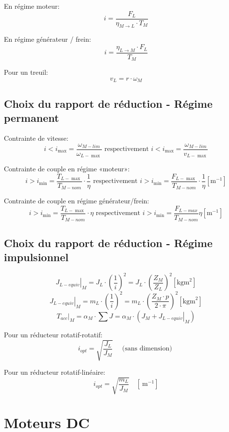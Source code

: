 \documentclass[12pt, twocolumn]{article}
\begin{document}
			En régime moteur:
			\[i = \frac{F_L}{\eta_{M \rightarrow L} \cdot T_M} \]
			
			En régime générateur / frein:
			\[i = \frac{\eta_{L \rightarrow M} \cdot F_L}{T_M} \]
			
			
			Pour un treuil:
			\[v_L = r \cdot \omega_M \]

		\subsection*{Choix du rapport de réduction - Régime permanent}
	
			Contrainte de vitesse:
			\[i<i_{\max }=\frac{\omega_{M-l i m}}{\omega_{L-\max }} \text{ respectivement } i<i_{\max }=\frac{\omega_{M-l i m}}{v_{L-\max }}\]
			
			Contrainte de couple en régime «moteur»:
			\[i>i_{\min }=\frac{T_{L-\max }}{T_{M-n o m}} \cdot \frac{1}{\eta} \text{ respectivement } i>i_{\min }=\frac{F_{L-\max }}{T_{M-n o m}} \cdot \frac{1}{\eta}\left[\mathrm{m}^{-1}\right]\]
			
			Contrainte de couple en régime générateur/frein:
			\[i>i_{\min }=\frac{T_{L-\max }}{T_{M-n o m}} \cdot \eta \text{ respectivement } i>i_{\min }=\frac{F_{L-m a x}}{T_{M-n o m}} \eta\left[\mathrm{m}^{-1}\right]\]
		
		\subsection*{Choix du rapport de réduction - Régime impulsionnel}
		
			\[\left.J_{L-equiv}\right|_{M}=J_{L} \cdot\left(\frac{1}{i}\right)^{2}=J_{L} \cdot\left(\frac{Z_{M}}{Z_{L}}\right)^{2}\left[\mathrm{kgm}^{2}\right]\]
			\[\left.J_{L-equiv}\right|_{M}=m_{L} \cdot\left(\frac{1}{i}\right)^{2}=m_{L} \cdot\left(\frac{Z_{M} \cdot p}{2 \cdot \pi}\right)^{2}\left[\mathrm{kgm}^{2}\right]\]
			\[\left.T_{a c c}\right|_{M}=\alpha_{M} \cdot \sum J=\alpha_{M} \cdot\left(J_{M}+\left.J_{L-equiv}\right|_{M}\right)\]
			
			Pour un réducteur rotatif-rotatif:
			\[i_{o p t}=\sqrt{\frac{J_{L}}{J_{M}}} \quad \text { (sans dimension) }\]
			
			Pour un réducteur rotatif-linéaire:
			\[i_{o p t}=\sqrt{\frac{m_{L}}{J_{M}}} \quad\left[\mathrm{~m}^{-1}\right]\]

	\section*{Moteurs DC}
		
\end{document}
